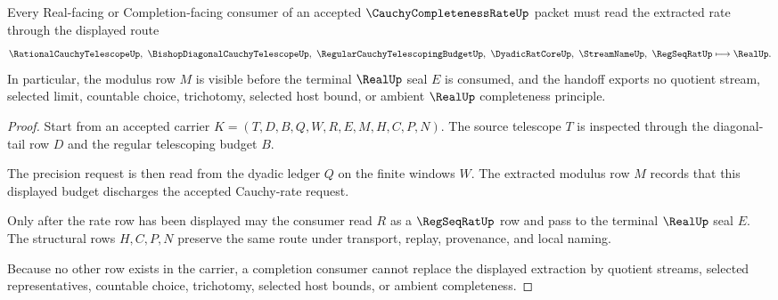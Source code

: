 \begin{theorem}
\label{thm:cauchy-completeness-rate-modulus-extraction}
Every Real-facing or Completion-facing consumer of an accepted $\CauchyCompletenessRateUp$ packet must read the extracted rate through the displayed route
$$
\RationalCauchyTelescopeUp,\ \BishopDiagonalCauchyTelescopeUp,\ \RegularCauchyTelescopingBudgetUp,\ \DyadicRatCoreUp,\ \StreamNameUp,\ \RegSeqRatUp
\longmapsto \RealUp .
$$
In particular, the modulus row $M$ is visible before the terminal $\RealUp$ seal $E$ is consumed, and the handoff exports no quotient stream, selected limit, countable choice, trichotomy, selected host bound, or ambient $\RealUp$ completeness principle.
\end{theorem}
\begin{proof}
Start from an accepted carrier $K=(T,D,B,Q,W,R,E,M,H,C,P,N)$. The source telescope $T$ is inspected through the diagonal-tail row $D$ and the regular telescoping budget $B$.

The precision request is then read from the dyadic ledger $Q$ on the finite windows $W$. The extracted modulus row $M$ records that this displayed budget discharges the accepted Cauchy-rate request.

Only after the rate row has been displayed may the consumer read $R$ as a $\RegSeqRatUp$ row and pass to the terminal $\RealUp$ seal $E$. The structural rows $H,C,P,N$ preserve the same route under transport, replay, provenance, and local naming.

Because no other row exists in the carrier, a completion consumer cannot replace the displayed extraction by quotient streams, selected representatives, countable choice, trichotomy, selected host bounds, or ambient completeness.
\end{proof}



